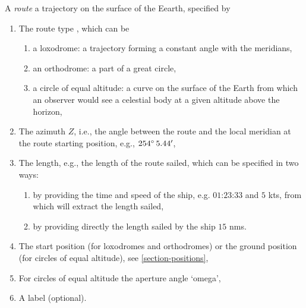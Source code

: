 \documentclass{ol-softwaremanual}
\begin{document}
A \textit{route} a trajectory on the surface of the Eearth, specified by 
\begin{enumerate}
  \item \label{item-route-type} The route type \cite{bowditch2002the}, which can be 
  \begin{enumerate}
  \item a loxodrome: a trajectory forming a constant angle with the meridians,
  \item an orthodrome: a part of a great circle,
  \item  a circle of equal altitude: a curve on the surface of the Earth from which an observer would see a celestial body at a given altitude above the horizon,
  \end{enumerate}
  \item \label{item-route-azimuth} The azimuth $Z$, i.e., the angle between the route  and the local meridian at the route starting position, e.g., $254 \degree \, 5.44'$,
  \item \label{item-route-length} The length, e.g., the length of the route sailed, which can be specified in two ways:
  \begin{enumerate}
  \item by providing the time and speed of the ship, e.g.  $01$:$23$:$33$ and $5$ \acp{kt}, from which  \thel will extract the length sailed,  
  \item by providing directly the length sailed by the ship  $15$ \acp{nm}. 

  \end{enumerate}

  \item \label{item-route-reference-position} The start position (for loxodromes and orthodromes) or the ground position (for circles of equal altitude), see \cref{section-positions},
  \item \label{item-route-aperture} For circles of equal altitude the aperture angle `omega',
  \item \label{item-route-label} A label (optional). 
\end{enumerate}
\end{document}
